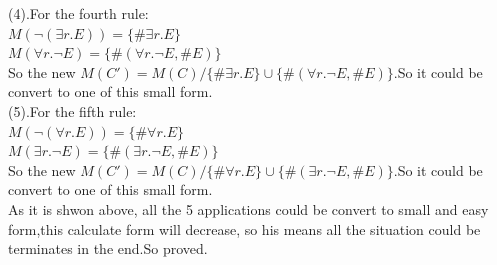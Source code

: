 \documentclass{article}
\begin{document}
    (4).For the fourth rule:\\
    $M(\neg (\exists r.E)) =\{\# \exists r.E\}$\\
    $M(\forall r.\neg E) =\{\#(\forall r.\neg E, \# E)\}$\\
    So the new $M(C') = M(C) / \{\# \exists r.E\} \cup  \{\#(\forall r.\neg E, \# E)\}$.So it could be convert to one of this small form.\\
    (5).For the fifth rule:\\
    $M(\neg (\forall r.E)) =\{\# \forall r.E\}$\\
    $M(\exists r.\neg E) =\{\#(\exists r.\neg E, \# E)\}$\\
    So the new $M(C') = M(C) / \{\# \forall r.E\} \cup  \{\#(\exists r.\neg E, \# E)\}$.So it could be convert to one of this small form.\\
    As it is shwon above, all the 5 applications could be convert to small and easy form,this calculate form will decrease, so his means all the situation could be terminates in the end.So proved.\\
\end{document}
